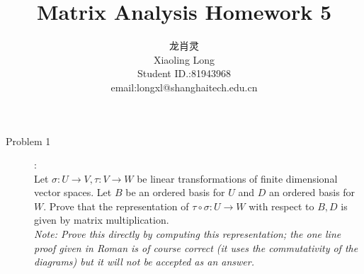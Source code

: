 \documentclass[a4paper]{article}
\title{Matrix Analysis Homework 5}
\author{龙肖灵 \\Xiaoling Long\\Student ID.:81943968\\email:longxl@shanghaitech.edu.cn}
\begin{document}
\maketitle

\begin{description}
\item[Problem 1]:\\
Let $\sigma: U \rightarrow V, \tau: V\rightarrow W$ be linear
transformations of finite dimensional vector spaces. Let $B$
be an ordered basis for $U$ and $D$ an ordered basis for $W$.
Prove that the representation of $\tau\circ\sigma :
U\rightarrow W$ with respect to $B, D$ is given by matrix
multiplication. \\
\textit{Note: Prove this directly by computing this
representation; the one line proof given in Roman is of
course correct (it uses the commutativity of the diagrams)
but it will not be accepted as an answer. }


\end{description}
\end{document}
